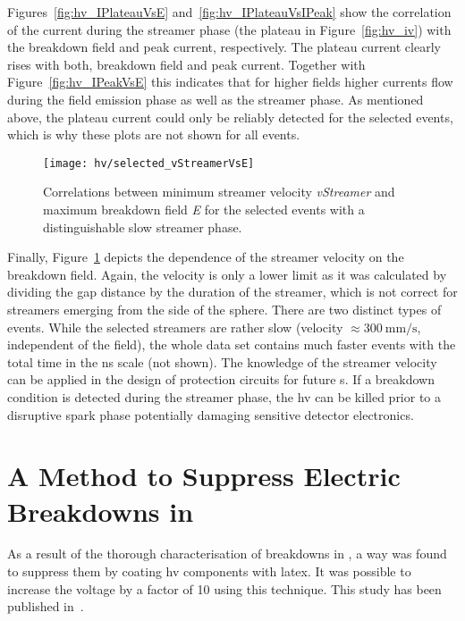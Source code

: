 Figures~\ref{fig:hv_IPlateauVsE} and~\ref{fig:hv_IPlateauVsIPeak} show the correlation of the current during the streamer phase (the plateau in Figure~\ref{fig:hv_iv}) with the breakdown field and peak current, respectively.
The plateau current clearly rises with both, breakdown field and peak current.
Together with Figure~\ref{fig:hv_IPeakVsE} this indicates that for higher fields higher currents flow during the field emission phase as well as the streamer phase.
As mentioned above, the plateau current could only be reliably detected for the selected events, which is why these plots are not shown for all events.

\begin{figure}[tbp]
	\centering
	\texttt{[image: hv/selected\_vStreamerVsE]}
	\caption[ test minimum streamer velocity versus maximum breakdown field]{%
		Correlations between minimum streamer velocity \emph{vStreamer} and maximum breakdown field \emph{E} for the selected events with a distinguishable slow streamer phase.
	}
	\label{fig:hv_vStreamerVsE}
\end{figure}

Finally, Figure~\ref{fig:hv_vStreamerVsE} depicts the dependence of the streamer velocity on the breakdown field.
Again, the velocity is only a lower limit as it was calculated by dividing the gap distance by the duration of the streamer, which is not correct for streamers emerging from the side of the sphere.
There are two distinct types of events.
While the selected streamers are rather slow (velocity $\approx \SI{300}{\milli\metre\per\second}$, independent of the field), the whole data set contains much faster events with the total time in the \si{\nano\second} scale (not shown).
The knowledge of the streamer velocity can be applied in the design of protection circuits for future \lartpc{}s.
If a breakdown condition is detected during the streamer phase, the \gls{hv} can be killed prior to a disruptive spark phase potentially damaging sensitive detector electronics.


\section{A Method to Suppress Electric Breakdowns in }
\label{sec:studies_latex}

As a result of the thorough characterisation of breakdowns in \lar{}, a way was found to suppress them by coating \gls{hv} components with latex.
It was possible to increase the voltage by a factor of \num{10} using this technique.
This study has been published in~\cite{latex}.

